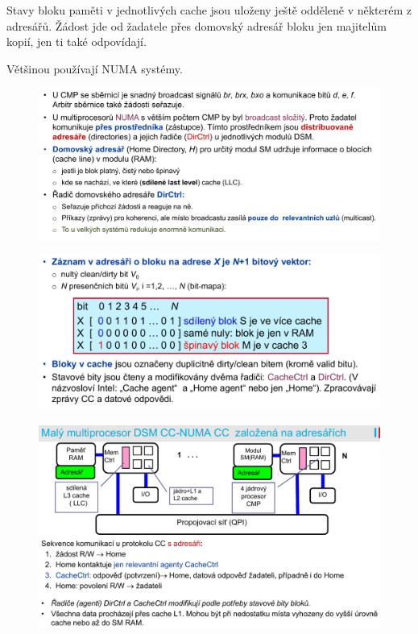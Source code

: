 \begin{compactitem}
    \item Stavy bloku paměti v jednotlivých cache jsou uloženy ještě odděleně v některém z adresářů. Žádost jde od žadatele přes domovský adresář bloku jen majitelům kopií, jen ti také odpovídají.

    \item Většinou používají NUMA systémy.

    \begin{figure}[H]
        \centering
        \includegraphics[width=1\linewidth]{distribuovane_1.pdf}
    \end{figure}

    \begin{figure}[H]
        \centering
        \includegraphics[width=1\linewidth]{distribuovane_2.pdf}
    \end{figure}

    \begin{figure}[H]
        \centering
        \includegraphics[width=1\linewidth]{distribuovane_3.pdf}
    \end{figure}
\end{compactitem}
